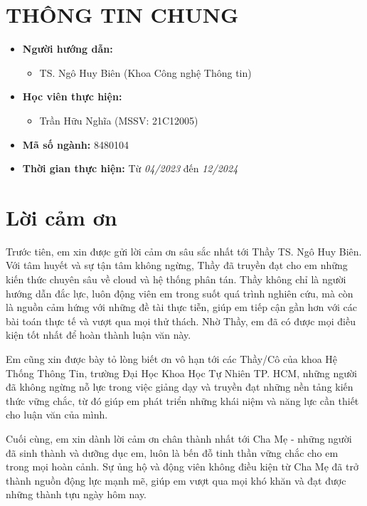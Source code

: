 \documentclass{article}[14pt]
\begin{document}
    \vspace{.5cm}
    
    \Large
    \section{THÔNG TIN CHUNG}
    \begin{itemize}[label = {}]
        
        \item \textbf{Người hướng dẫn:} 
        \begin{itemize}
            \item TS. Ngô Huy Biên (Khoa Công nghệ Thông tin)
        \end{itemize}{}
    
        
        \item \textbf{Học viên thực hiện:}
        
        \begin{itemize}
        
            \item Trần Hữu Nghĩa (MSSV: 21C12005) 
           
        \end{itemize}

        \item \textbf{Mã số ngành:} 8480104
        
        \item \textbf{Thời gian thực hiện:} Từ \textit{04/2023} đến \textit{12/2024}
        
        
    \end{itemize}
    
    \pagebreak 
    
    \section{Lời cảm ơn}
    {
    Trước tiên, em xin được gửi lời cảm ơn sâu sắc nhất tới Thầy TS. Ngô Huy Biên. Với tâm huyết và sự tận tâm không ngừng, Thầy đã truyền đạt cho em những kiến thức chuyên sâu về cloud và hệ thống phân tán. Thầy không chỉ là người hướng dẫn đắc lực, luôn động viên em trong suốt quá trình nghiên cứu, mà còn là nguồn cảm hứng với những đề tài thực tiễn, giúp em tiếp cận gần hơn với các bài toán thực tế và vượt qua mọi thử thách. Nhờ Thầy, em đã có được mọi điều kiện tốt nhất để hoàn thành luận văn này.

Em cũng xin được bày tỏ lòng biết ơn vô hạn tới các Thầy/Cô của khoa Hệ Thống Thông Tin, trường Đại Học Khoa Học Tự Nhiên TP. HCM, những người đã không ngừng nỗ lực trong việc giảng dạy và truyền đạt những nền tảng kiến thức vững chắc, từ đó giúp em phát triển những khái niệm và năng lực cần thiết cho luận văn của mình.

Cuối cùng, em xin dành lời cảm ơn chân thành nhất tới Cha Mẹ - những người đã sinh thành và dưỡng dục em, luôn là bến đỗ tinh thần vững chắc cho em trong mọi hoàn cảnh. Sự ủng hộ và động viên không điều kiện từ Cha Mẹ đã trở thành nguồn động lực mạnh mẽ, giúp em vượt qua mọi khó khăn và đạt được những thành tựu ngày hôm nay.
    }
\end{document}
